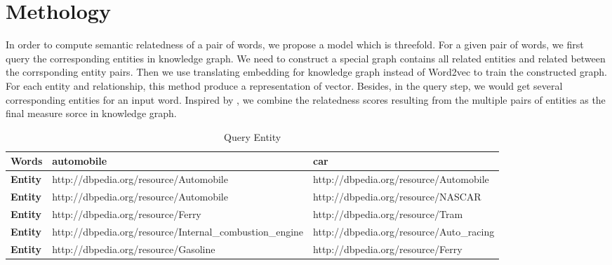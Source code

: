 \section{Methology}
In order to compute semantic relatedness of a pair of words, we propose a model which is
threefold. 
For a given pair of words, we first query the corresponding entities in knowledge graph.
We need to construct a special graph contains all related entities and related between the 
corrsponding entity pairs.
Then we use translating embedding for knowledge graph instead of Word2vec to train the constructed 
graph. For each entity and relationship, this method produce a representation of vector.
Besides, in the query step, we would get several corresponding entities for an input word. Inspired by
\cite{acl/IacobacciPN15}, we combine the relatedness scores resulting from the multiple pairs of entities 
as the final measure sorce in knowledge graph.

\begin{table*}[]
    \small
    \centering
    \caption{Query Entity}
    \label{entities}
    \begin{tabular}{@{}|l|l|l|@{}}
    \toprule
    \textbf{Words}  & automobile                                               & car                                      \\ \midrule
    \textbf{Entity} & http://dbpedia.org/resource/Automobile                   & http://dbpedia.org/resource/Automobile   \\ \midrule
    \textbf{Entity} & http://dbpedia.org/resource/Automobile                   & http://dbpedia.org/resource/NASCAR       \\ \midrule
    \textbf{Entity} & http://dbpedia.org/resource/Ferry                        & http://dbpedia.org/resource/Tram         \\ \midrule
    \textbf{Entity} & http://dbpedia.org/resource/Internal\_combustion\_engine & http://dbpedia.org/resource/Auto\_racing \\ \midrule
    \textbf{Entity} & http://dbpedia.org/resource/Gasoline                     & http://dbpedia.org/resource/Ferry        \\ \bottomrule
    \end{tabular}    
\end{table*}

